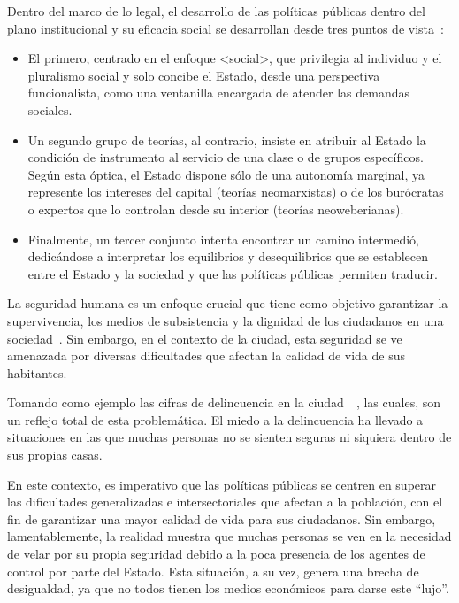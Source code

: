 \documentclass[letterpaper, 12pt]{article}
\begin{document}
Dentro del marco de lo legal, el desarrollo de las
políticas públicas dentro del plano institucional y su
eficacia social se desarrollan desde tres puntos de
vista~\cite{Thoenig}:

\begin{itemize}
    \item El primero, centrado en el enfoque <social>, que privilegia
          al individuo y el pluralismo social y solo concibe el
          Estado, desde una perspectiva funcionalista, como una
          ventanilla encargada de atender las demandas sociales.

    \item Un segundo grupo de teorías, al contrario, insiste en
          atribuir al Estado la condición de instrumento al servicio
          de una clase o de grupos específicos. Según esta óptica, el
          Estado dispone sólo de una autonomía marginal, ya
          represente los intereses del capital (teorías neomarxistas)
          o de los burócratas o expertos que lo controlan desde su
          interior (teorías neoweberianas).

    \item Finalmente, un tercer conjunto intenta encontrar un camino
          intermedió, dedicándose a interpretar los equilibrios y
          desequilibrios que se establecen entre el Estado y la
          sociedad y que las políticas públicas permiten traducir.
\end{itemize}


La seguridad humana es un enfoque crucial que tiene como
objetivo garantizar la supervivencia, los medios de
subsistencia y la dignidad de los ciudadanos en una
sociedad~\cite{DSUAdmin}. Sin embargo, en el contexto de la
ciudad, esta seguridad se ve amenazada por diversas
dificultades que afectan la calidad de vida de sus
habitantes.

Tomando como ejemplo las cifras de delincuencia en la
ciudad~\cite{cifras_crimenes_1}~\cite{cifras_crimenes_2},
las cuales, son un reflejo total de esta problemática. El
miedo a la delincuencia ha llevado a situaciones en las que
muchas personas no se sienten seguras ni siquiera dentro de
sus propias casas.

En este contexto, es imperativo que las políticas públicas
se centren en superar las dificultades generalizadas e
intersectoriales que afectan a la población, con el fin de
garantizar una mayor calidad de vida para sus ciudadanos.
Sin embargo, lamentablemente, la realidad muestra que
muchas personas se ven en la necesidad de velar por su
propia seguridad debido a la poca presencia de los agentes
de control por parte del Estado. Esta situación, a su vez,
genera una brecha de desigualdad, ya que no todos tienen
los medios económicos para darse este ``lujo''.

\newpage

\printbibliography
\end{document}
